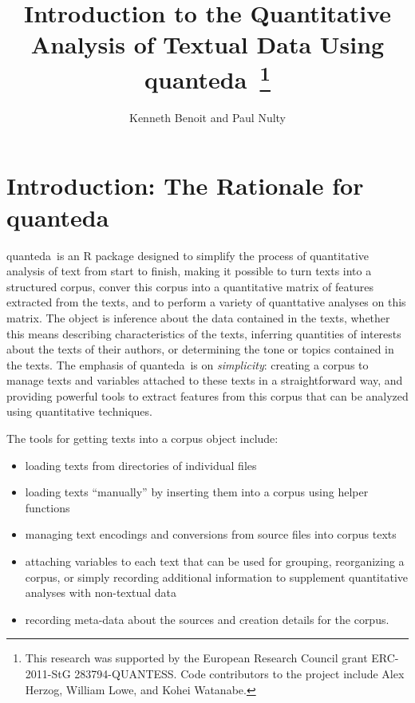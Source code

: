 \documentclass[11pt]{article}\usepackage[]{graphicx}\usepackage[]{color}
\newcommand{\quanteda}{\textsf{quanteda}\ }
\begin{document}







\title{Introduction to the Quantitative Analysis of Textual Data Using
  \quanteda\thanks{This research was supported by the European
    Research Council grant ERC-2011-StG 283794-QUANTESS.  Code
    contributors to the project include Alex Herzog, William Lowe, and
    Kohei Watanabe.}}

\author{Kenneth Benoit and Paul Nulty}

\maketitle

\setlength{\parskip}{1ex}
\setlength{\parindent}{0ex}

\section{Introduction: The Rationale for \quanteda}

\quanteda is an R package designed to simplify the process of
quantitative analysis of text from start to finish, making it possible
to turn texts into a structured corpus, conver this corpus into a
quantitative matrix of features extracted from the texts, and to
perform a variety of quanttative analyses on this matrix.  The object
is inference about the data contained in the texts, whether this means
describing characteristics of the texts, inferring quantities of
interests about the texts of their authors, or determining the tone or
topics contained in the texts.  The emphasis of \quanteda is on
\emph{simplicity}: creating a corpus to manage texts and variables
attached to these texts in a straightforward way, and providing
powerful tools to extract features from this corpus that can be
analyzed using quantitative techniques.

The tools for getting texts into a corpus object include: 
\begin{itemize}
\item loading texts from directories of individual files
\item loading texts ``manually'' by inserting them into a corpus using
  helper functions
\item managing text encodings and conversions from source files into
  corpus texts
\item attaching variables to each text that can be used for grouping,
  reorganizing a corpus, or simply recording additional information to
  supplement quantitative analyses with non-textual data
\item recording meta-data about the sources and creation details for
  the corpus.
\end{itemize}
\end{document}
